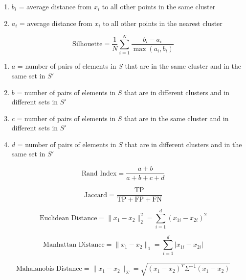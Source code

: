 \documentclass[10pt]{article}
\begin{document}
\begin{multicols}{2}
\begin{enumerate}
    \item $b_i$ = average distance from $x_i$ to all other points in the same cluster
    \vspace*{-6pt}
    \item $a_i$ = average distance from $x_i$ to all other points in the nearest cluster
\end{enumerate}
\begin{equation*}
    \text{Silhouette} = \frac{1}{N} \sum_{i=1}^{N} \frac{b_i - a_i}{\max(a_i, b_i)}
\end{equation*}

\begin{enumerate}
    \item $a$ = number of pairs of elements in $S$ that are in the same cluster and in the same set in $S'$
    \vspace*{-6pt}
    \item $b$ = number of pairs of elements in $S$ that are in different clusters and in different sets in $S'$
    \vspace*{-6pt}
    \item $c$ = number of pairs of elements in $S$ that are in the same cluster and in different sets in $S'$
    \vspace*{-6pt}
    \item $d$ = number of pairs of elements in $S$ that are in different clusters and in the same set in $S'$
\end{enumerate}

\begin{equation*}
    \text{Rand Index} = \frac{a + b}{a + b + c + d}
\end{equation*}

\begin{equation*}
    \text{Jaccard} = \frac{\text{TP}}{\text{TP} + \text{FP} + \text{FN}}
\end{equation*}


\begin{equation*}
   \text{Euclidean Distance} = \lVert x_1 - x_2 \rVert_2^2 = \sum_{i=1}^{d} (x_{1i} - x_{2i})^2
\end{equation*}

\begin{equation*}
    \text{Manhattan Distance} = \lVert x_1 - x_2 \rVert_1 = \sum_{i=1}^{d} \lvert x_{1i} - x_{2i} \rvert
\end{equation*}

\begin{equation*}
    \text{Mahalanobis Distance} = \lVert x_1 - x_2 \rVert_{\Sigma} = \sqrt{(x_1 - x_2)^T \Sigma^{-1} (x_1 - x_2)}
\end{equation*}

\end{multicols}
\end{document}
